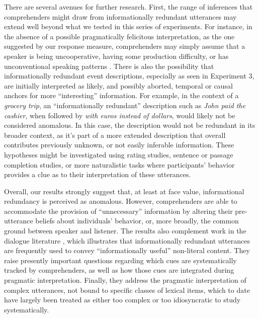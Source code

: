 There are several avenues for further research. First, the range of
inferences that comprehenders might draw from informationally redundant
utterances may extend well beyond what we tested in this series of
experiments. For instance, in the absence of a possible pragmatically
felicitous interpretation, as the one suggested by our response measure,
comprehenders may simply assume that a speaker is being uncooperative,
having some production difficulty, or has unconventional speaking
patterns \citep[cf.][]{Grodner2011, Pogue2016}. There is
also the possibility that informationally redundant event descriptions,
especially as seen in Experiment 3, are initially interpreted as likely,
and possibly aborted, temporal or causal anchors for more
\enquote{interesting} information. For example, in the context of a
\emph{grocery trip}, an \enquote{informationally redundant} description
such as \emph{John paid the cashier}, when followed by \emph{with euros
instead of dollars}, would likely not be considered anomalous. In this
case, the description would not be redundant in its broader context, as
it's part of a more extended description that overall contributes
previously unknown, or not easily inferable information. These
hypotheses might be investigated using rating studies, sentence or
passage completion studies, or more naturalistic tasks where
participants' behavior provides a clue as to their interpretation of
these utterances.

Overall, our results strongly suggest that, at least at face value,
informational redundancy is perceived as anomalous. However,
comprehenders are able to accommodate the provision of
\enquote{unnecessary} information by altering their pre-utterance
beliefs about individuals' behavior, or, more broadly, the common ground
between speaker and listener. The results also complement work in the
dialogue literature \citep{Walker1993}, which illustrates that
informationally redundant utterances are frequently used to convey
\enquote{informationally useful} non-literal content. They raise
presently important questions regarding which cues are systematically
tracked by comprehenders, as well as how those cues are integrated
during pragmatic interpretation. Finally, they address the pragmatic
interpretation of complex utterances, not bound to specific classes of
lexical items, which to date have largely been treated as either too
complex or too idiosyncratic to study systematically.